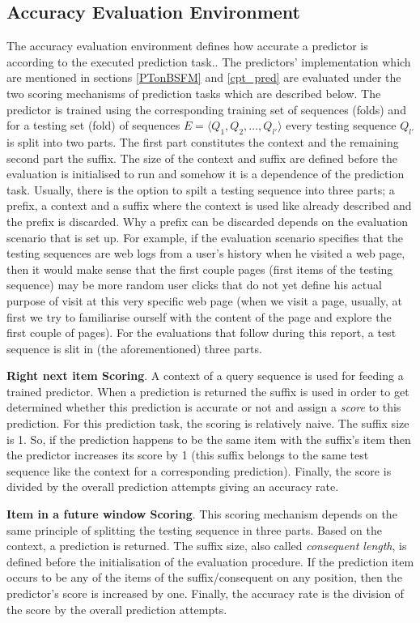\subsection{Accuracy Evaluation Environment}
The accuracy evaluation environment defines how accurate a predictor is according to the executed prediction task.. The predictors' implementation which are mentioned in sections \ref{PTonBSFM} and \ref{cpt_pred} are evaluated under the two scoring mechanisms of prediction tasks which are described below. The predictor is trained using the corresponding training set of sequences (folds) and for a testing set (fold) of sequences $E = \langle Q_1, Q_2, \ldots, Q_{l\prime}\rangle$ every testing sequence $Q_{l\prime}$ is split into two parts. The first part constitutes the context and the remaining second part the suffix. The size of the context and suffix are defined before the evaluation is initialised to run and somehow it is a dependence of the prediction task. Usually, there is the option to spilt a testing sequence into three parts; a prefix, a context and a suffix where the context is used like already described and the prefix is discarded. Why a prefix can be discarded depends on the evaluation scenario that is set up. For example, if the evaluation scenario specifies that the testing sequences are web logs from a user's history when he visited a web page, then it would make sense that the first couple pages (first items of the testing sequence) may be more random user clicks that do not yet define his actual purpose of visit at this very specific web page (when we visit a page, usually, at first we try to familiarise ourself with the content of the page and explore the first couple of pages). For the evaluations that follow during this report, a test sequence is slit in (the aforementioned) three parts. 
\par\textbf{Right next item Scoring}. A context of a query sequence is used for feeding a trained predictor. When a prediction is returned the suffix is used in order to get determined whether this prediction is accurate or not and assign a \emph{score} to this prediction. For this prediction task, the scoring is relatively naive. The suffix size is 1. So, if the prediction happens to be the same item with the suffix's item then the predictor increases its score by 1 (this suffix belongs to the same test sequence like the context for a corresponding prediction). Finally, the score is divided by the overall prediction attempts giving an accuracy rate.
\par\textbf{Item in a future window Scoring}. This scoring mechanism \cite{gueniche_fournier-viger_tseng_2013} depends on the same principle of splitting the testing sequence in three parts. Based on the context, a prediction is returned. The suffix size, also called \emph{consequent length}, is defined before the initialisation of the evaluation procedure. If the prediction item occurs to be any of the items of the suffix/consequent on any position, then the predictor's score is increased by one. Finally, the accuracy rate is the division of the score by the overall prediction attempts.
